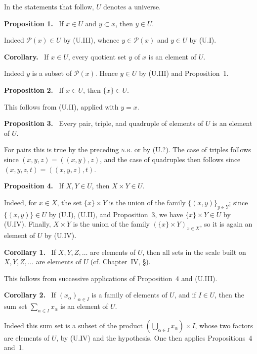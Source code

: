 \documentclass[11pt]{article}
\newcommand{\Pset}{\mathcal{P}}
\newcommand{\cf}{cf.}
\newcommand{\NB}{\textsc{n.b.}}
\newenvironment{statement}[1]{\par\medskip\noindent\textbf{#1.}\ }{\par\medskip}
\begin{document}
In the statements that follow, \(U\) denotes a universe.

\begin{statement}{Proposition 1}
If \(x\in U\) and \(y\subset x\), then \(y\in U\).
\end{statement}
Indeed \(\Pset(x)\in U\) by (U.III), whence \(y\in\Pset(x)\) and \(y\in U\) by (U.I).

\begin{statement}{Corollary}
If \(x\in U\), every quotient set \(y\) of \(x\) is an element of \(U\).
\end{statement}
Indeed \(y\) is a subset of \(\Pset(x)\). Hence \(y\in U\) by (U.III) and Proposition~1.

\begin{statement}{Proposition 2}
If \(x\in U\), then \(\{x\}\in U\).
\end{statement}
This follows from (U.II), applied with \(y=x\).

\begin{statement}{Proposition 3}
Every pair, triple, and quadruple of elements of \(U\) is an element of \(U\).
\end{statement}
For pairs this is true by the preceding \NB{} or by (U.?). The case of triples follows since \((x,y,z)=((x,y),z)\), and the case of quadruples then follows since \((x,y,z,t)=((x,y,z),t)\).

\begin{statement}{Proposition 4}
If \(X,Y\in U\), then \(X\times Y\in U\).
\end{statement}
Indeed, for \(x\in X\), the set \(\{x\}\times Y\) is the union of the family \(\{(x,y)\}_{y\in Y}\); since \(\{(x,y)\}\in U\) by (U.I), (U.II), and Proposition~3, we have \(\{x\}\times Y\in U\) by (U.IV). Finally, \(X\times Y\) is the union of the family \((\{x\}\times Y)_{x\in X}\), so it is again an element of \(U\) by (U.IV).

\begin{statement}{Corollary 1}
If \(X,Y,Z,\ldots\) are elements of \(U\), then all sets in the scale built on \(X,Y,Z,\ldots\) are elements of \(U\) (\cf{} Chapter~IV, \S{}).
\end{statement}
This follows from successive applications of Proposition~4 and (U.III).

\begin{statement}{Corollary 2}
If \((x_\alpha)_{\alpha\in I}\) is a family of elements of \(U\), and if \(I\in U\), then the sum set \(\sum_{\alpha\in I}x_\alpha\) is an element of \(U\).
\end{statement}
Indeed this sum set is a subset of the product \((\bigcup_{\alpha\in I}x_\alpha)\times I\), whose two factors are elements of \(U\), by (U.IV) and the hypothesis. One then applies Propositions~4 and~1.
\end{document}
